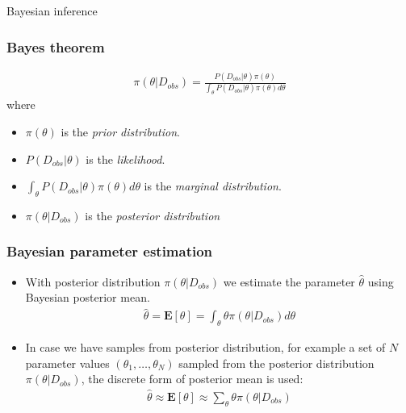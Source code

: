 \documentclass{beamer}
\begin{document}
\begin{frame}
    \begin{center}
        \Huge Bayesian inference
    \end{center}
\end{frame}

\begin{frame}
    \frametitle{Bayes theorem}
    \begin{definition}
        \rm
        \begin{align*}
            \pi(\theta | D_{obs}) = \frac{P(D_{obs}|\theta)\pi(\theta)}{\int_\theta P(D_{obs}|\theta)\pi(\theta)d\theta}
        \end{align*}
        where
        \begin{itemize}
            \item $\pi(\theta)$ is the \textit{prior distribution}.
            \item $P(D_{obs}|\theta)$ is the \textit{likelihood}.
            \item $\int_\theta P(D_{obs}|\theta)\pi(\theta)d\theta$ is the \textit{marginal distribution}.
            \item $\pi(\theta | D_{obs})$ is the \textit{posterior distribution}
        \end{itemize}
    \end{definition}
\end{frame}

\begin{frame}
    \frametitle{Bayesian parameter estimation}
    \begin{itemize}
        \item With posterior distribution $\pi(\theta|D_{obs})$ we estimate the parameter $\hat{\theta}$ using Bayesian
              posterior mean.
              \begin{align*}
                  \hat{\theta} = \mathbf{E}[\theta] = \int_\theta \theta \pi(\theta|D_{obs}) d\theta
              \end{align*}
        \item In case we have samples from posterior distribution, for example a set of $N$ parameter values
              $(\theta_1,\ldots,\theta_N)$ sampled from the posterior distribution $\pi(\theta|D_{obs})$, the
              discrete form of posterior mean is used:
              \begin{align*}
                  \hat{\theta} \approx \mathbf{E}[\theta] \approx \sum_\theta \theta \pi(\theta|D_{obs})
              \end{align*}
    \end{itemize}
\end{frame}
\end{document}
